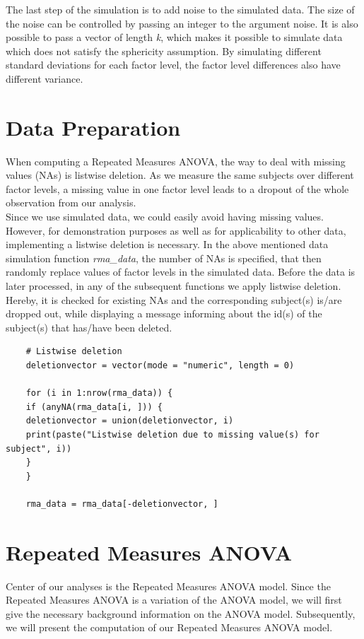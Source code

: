 \documentclass[11pt]{article}
\begin{document}
				 The last step  of the simulation is to add noise to the simulated data. The size of the noise can be controlled by passing an integer to the argument noise. It is also possible to pass a vector of length \textit{k}, which makes it possible to simulate data which does not satisfy the sphericity assumption. By simulating different standard deviations for each factor level, the factor level differences also have different variance.
				 
	\section{Data Preparation}
	When computing a Repeated Measures ANOVA, the way to deal with missing values (NAs) is listwise deletion. As we measure the same subjects over different factor levels, a missing value in one factor level leads to a dropout of the whole observation from our analysis.\\
	
	Since we use simulated data, we could easily avoid having missing values. However, for demonstration purposes as well as for applicability to other data, implementing a listwise deletion is necessary. In the above mentioned data simulation function \textit{rma\_data}, the number of NAs is specified, that then randomly replace values of factor levels in the simulated data. Before the data is later processed, in any of the subsequent functions we apply listwise deletion. Hereby, it is checked for existing NAs and the corresponding subject(s) is/are dropped out, while displaying a message informing about the id(s) of the subject(s) that has/have been deleted.\\
	
	\begin{lstlisting}
	# Listwise deletion
	deletionvector = vector(mode = "numeric", length = 0)
	
	for (i in 1:nrow(rma_data)) {
	if (anyNA(rma_data[i, ])) {
	deletionvector = union(deletionvector, i)
	print(paste("Listwise deletion due to missing value(s) for subject", i))
	}
	}
	
	rma_data = rma_data[-deletionvector, ]
	\end{lstlisting}
	
	
	
	
	\section{Repeated Measures ANOVA} 
	Center of our analyses is the Repeated Measures ANOVA model. Since the Repeated Measures ANOVA is a variation of the ANOVA model, we will first give the necessary background information on the ANOVA model. Subsequently, we will present the computation of our Repeated Measures ANOVA model.
	
\end{document}
